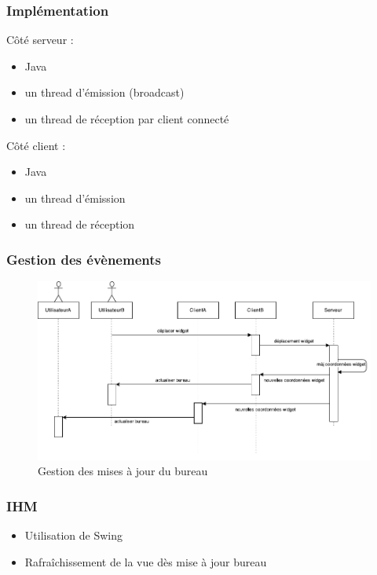 \begin{frame}
	\frametitle{Implémentation}	
	
	Côté serveur :
	\begin{itemize}
		\item Java
		\item un thread d'émission (broadcast)
		\item un thread de réception par client connecté
	\end{itemize}

	Côté client :
	\begin{itemize}
		\item Java
		\item un thread d'émission
		\item un thread de réception
	\end{itemize}

\end{frame}

\begin{frame}
	\frametitle{Gestion des évènements}
	\begin{figure}
		\includegraphics[scale=0.7]{resources/DI2.pdf}
		\caption{Gestion des mises à jour du bureau}
	\end{figure}
\end{frame}

\begin{frame}
	\frametitle{IHM}
	\begin{itemize}
		\item Utilisation de Swing
		\item Rafraîchissement de la vue dès mise à jour bureau
	\end{itemize}
\end{frame}